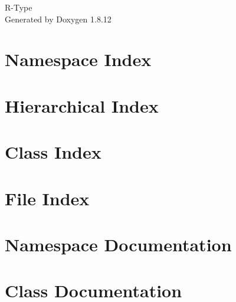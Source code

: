 \documentclass[twoside]{book}
\newcommand{\+}{\discretionary{\mbox{\scriptsize$\hookleftarrow$}}{}{}}
\newcommand{\clearemptydoublepage}{%
  \newpage{\pagestyle{empty}\cleardoublepage}%
}
\begin{document}
\begin{titlepage}
\vspace*{7cm}
\begin{center}%
{\Large R-\/\+Type }\\
\vspace*{1cm}
{\large Generated by Doxygen 1.8.12}\\
\end{center}
\end{titlepage}
\clearemptydoublepage
{}
\tableofcontents
\clearemptydoublepage
{}

\chapter{Namespace Index}

\chapter{Hierarchical Index}

\chapter{Class Index}

\chapter{File Index}

\chapter{Namespace Documentation}






\chapter{Class Documentation}










\end{document}
